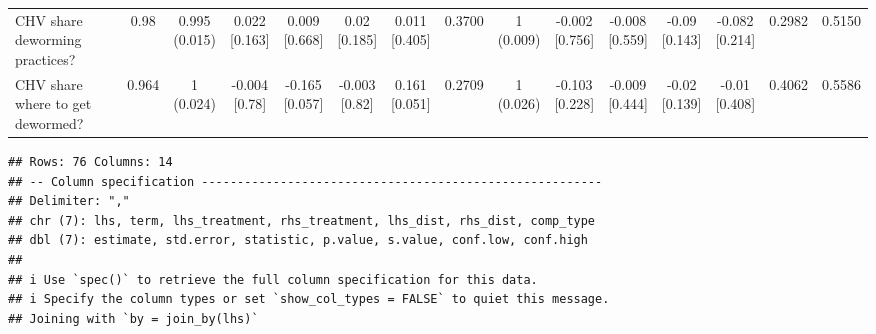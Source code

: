 \documentclass[
]{article}
\begin{document}
\begin{table}
{\begin{tabular}[t]{lcccccccccccccc}
\hspace{1em}CHV share deworming practices? & 0.98 & \makecell[c]{0.995\\(0.015)} & \makecell[c]{0.022\\{[0.163]}} & \makecell[c]{0.009\\{[0.668]}} & \makecell[c]{0.02\\{[0.185]}} & \makecell[c]{0.011\\{[0.405]}} & 0.3700 & \makecell[c]{1\\(0.009)} & \makecell[c]{-0.002\\{[0.756]}} & \makecell[c]{-0.008\\{[0.559]}} & \makecell[c]{-0.09\\{[0.143]}} & \makecell[c]{-0.082\\{[0.214]}} & 0.2982 & 0.5150\\
\hspace{1em}CHV share where to get dewormed? & 0.964 & \makecell[c]{1\\(0.024)} & \makecell[c]{-0.004\\{[0.78]}} & \makecell[c]{-0.165\\{[0.057]}} & \makecell[c]{-0.003\\{[0.82]}} & \makecell[c]{0.161\\{[0.051]}} & 0.2709 & \makecell[c]{1\\(0.026)} & \makecell[c]{-0.103\\{[0.228]}} & \makecell[c]{-0.009\\{[0.444]}} & \makecell[c]{-0.02\\{[0.139]}} & \makecell[c]{-0.01\\{[0.408]}} & 0.4062 & 0.5586\\
\bottomrule
\end{tabular}}
\end{table}

\begin{verbatim}
## Rows: 76 Columns: 14
## -- Column specification --------------------------------------------------------
## Delimiter: ","
## chr (7): lhs, term, lhs_treatment, rhs_treatment, lhs_dist, rhs_dist, comp_type
## dbl (7): estimate, std.error, statistic, p.value, s.value, conf.low, conf.high
## 
## i Use `spec()` to retrieve the full column specification for this data.
## i Specify the column types or set `show_col_types = FALSE` to quiet this message.
## Joining with `by = join_by(lhs)`
\end{verbatim}
\end{document}
